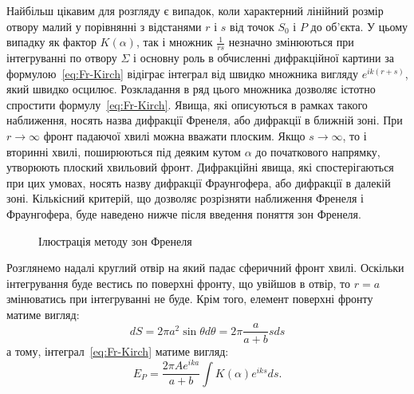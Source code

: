 Найбільш цікавим для розгляду є випадок, коли характерний лінійний розмір отвору малий у порівнянні з відстанями $r$ і $s$ від точок $S_0$ і $P$ до об'єкта. У цьому випадку як фактор $K(\alpha)$, так і множник $\frac{1}{rs}$ незначно змінюються при інтегруванні по отвору $\Sigma$ і основну роль в обчисленні дифракційної картини за формулою~\eqref{eq:Fr-Kirch} відіграє інтеграл від швидко множника вигляду $e^{ik(r+s)}$, який швидко осцилює. Розкладання в ряд цього множника дозволяє істотно спростити формулу~\eqref{eq:Fr-Kirch}. Явища, які описуються в рамках такого наближення, носять назва дифракції Френеля, або дифракції в ближній зоні. При $r \to \infty$ фронт падаючої хвилі можна вважати плоским. Якщо $s \to \infty$, то і вторинні хвилі, поширюються під деяким кутом $\alpha$ до початкового напрямку, утворюють плоский хвильовий фронт. Дифракційні явища, які спостерігаються при цих умовах, носять назву дифракції Фраунгофера, або дифракції в далекій зоні. Кількісний критерій, що дозволяє розрізняти наближення Френеля і Фраунгофера, буде наведено нижче після введення поняття зон Френеля.

\begin{figure}[h!]
	\centering
{} 
	\caption{Ілюстрація методу зон Френеля}
	\label{pic:Diffraction2}
\end{figure}

Розглянемо надалі круглий отвір на який падає сферичний фронт хвилі. Оскільки інтегрування буде вестись по поверхні фронту, що увійшов в отвір, то $r = a$ змінюватись при інтегруванні не буде. Крім того, елемент поверхні фронту матиме вигляд:
\[
    dS = 2\pi a^2 \sin\theta d\theta = 2\pi \frac{a}{a + b} s ds
\]
 а тому, інтеграл~\eqref{eq:Fr-Kirch} матиме вигляд:
\begin{equation}\label{eq:Fr-KirchSpher}
    E_P =  \frac{2\pi Ae^{ika}}{a + b} \int K(\alpha) e^{iks} ds.
\end{equation}

